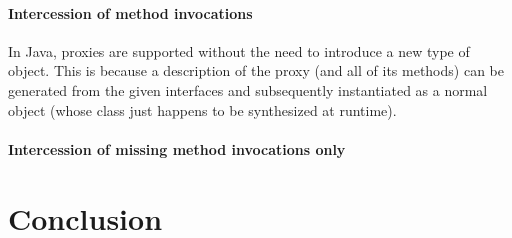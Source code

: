 \documentclass[10pt,legalpaper]{article}
\begin{document}
\paragraph{Intercession of method invocations}

In Java, proxies are supported without the need to introduce a new type of object. This is because a description of the proxy (and all of its methods) can be generated from the given interfaces and subsequently instantiated as a normal object (whose class just happens to be synthesized at runtime).



\paragraph{Intercession of missing method invocations only}




\section{Conclusion}



\end{document}
